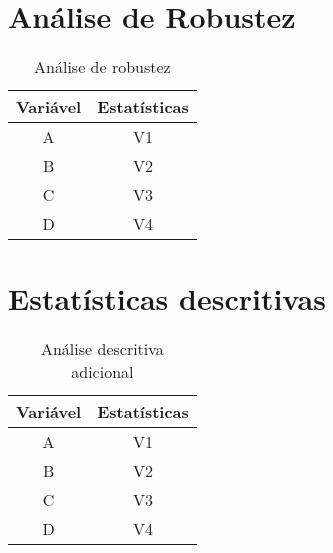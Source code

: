 \begin{apendicesenv}

  \chapter{Análise de Robustez}
  
  \begin{table}[H]
      \centering
      \caption{Análise de robustez}
      \begin{tabular}{c|c}
      \hline
           \textbf{Variável} & \textbf{Estatísticas}  \\ \hline
           A & V1\\
           B & V2\\
           C & V3\\
           D & V4\\ \hline
      \end{tabular}
      \label{tab:my_tab1}
  \end{table}
  
  
  \chapter{Estatísticas descritivas}
  
  \begin{table}[H]
      \centering
      \caption{Análise descritiva adicional}
      \begin{tabular}{c|c}
      \hline
           \textbf{Variável} & \textbf{Estatísticas}  \\ \hline
           A & V1\\
           B & V2\\
           C & V3\\
           D & V4\\ \hline
      \end{tabular}
      \label{tab:my_tab2}
  \end{table}
  
  \end{apendicesenv}